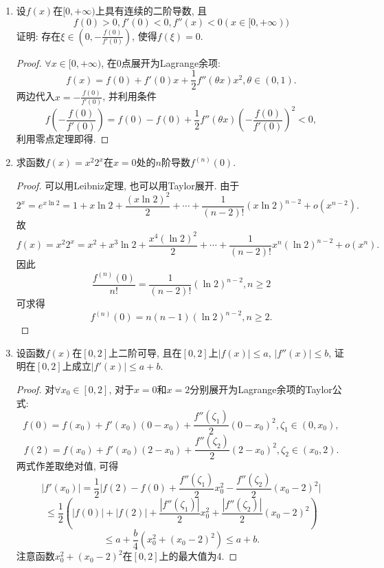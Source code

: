 \documentclass[UTF8,11pt, a4paper, oneside, fontset=none]{ctexbook}
\begin{document}
\begin{enumerate}
\begin{proof}
\end{proof}


\item 设$f(x)$在$[0, + \infty)$上具有连续的二阶导数, 且
\[
f(0) >0, f'(0) <0, f''(x) < 0 (x \in [0, + \infty))
\]
证明: 存在$\xi \in \left( 0, - \frac{f(0)}{f'(0)}\right)$, 使得$f(\xi ) = 0$.

\begin{proof}
$\forall x \in [0, + \infty)$, 在$0$点展开为Lagrange余项:
\[
f(x) = f(0) + f'(0)x + \frac{1}{2} f''(\theta x) x^2, \theta \in (0, 1).
\]
两边代入$x = - \frac{f(0)}{f'(0)}$, 并利用条件
\[
f\left(- \frac{f(0)}{f'(0)} \right) = f(0) - f(0) +  \frac{1}{2} f''(\theta x) \left( - \frac{f(0)}{f'(0)}\right)^2 <0,
\]
利用零点定理即得.
\end{proof}


\item 求函数$f(x) = x^2 2^x$在$x = 0$处的$n$阶导数$f^{(n)}(0)$.


\begin{proof}

可以用Leibniz定理, 也可以用Taylor展开. 由于
\[
2^x = e^{x \ln 2} = 1 + x \ln 2 + \frac{(x \ln 2)^2}{2} + \cdots + \frac{1}{(n-2)!} (x \ln 2)^{n-2} + o(x^{n-2}).
\]
故
\[
f(x) = x^2 2^x = x^2 + x^3 \ln 2 + \frac{x^4 (\ln 2)^2}{2} + \cdots + \frac{1}{(n-2)!} x^n (\ln 2)^{n-2} + o(x^n).
\]
因此
\[
\frac{f^{(n)}(0)}{n!} = \frac{1}{(n-2)!} (\ln 2)^{n-2}, n \geq 2
\]
可求得
\[
f^{(n)}(0) = n (n-1)(\ln 2)^{n-2}, n \geq 2.
\]

\end{proof}

\item 设函数$f(x)$在$[0, 2]$上二阶可导, 且在$[0, 2]$上$|f(x)| \leq a$, $|f''(x)| \leq b$, 证明在$[0, 2]$上成立$|f'(x)| \leq a+b$.


\begin{proof}

对$\forall x_0 \in [0, 2]$, 对于$x =0$和$x=2$分别展开为Lagrange余项的Taylor公式:
\[
f(0) = f(x_0) + f'(x_0) (0 - x_0) + \frac{f''(\zeta_1)}{2} (0 - x_0)^2, \zeta_1 \in (0, x_0),
\]
\[
f(2) = f(x_0) + f'(x_0) (2 - x_0) + \frac{f''(\zeta_2)}{2} (2 - x_0)^2, \zeta_2 \in (x_0, 2).
\]
两式作差取绝对值, 可得
\[
|f'(x_0)| = \frac{1}{2} \Big| f(2) - f(0) + \frac{f''(\zeta_1)}{2}x_0^2 - \frac{f''(\zeta_2)}{2} (x_0 - 2)^2 \Big|
\]
\[
\leq \frac{1}{2} \left( |f(0)| + |f(2)| + \frac{|f''(\zeta_1)|}{2}x_0^2 +  \frac{|f''(\zeta_2)|}{2} (x_0 - 2)^2  \right)
\]
\[
\leq a + \frac{b}{4} (x_0^2 + (x_0 - 2)^2) \leq a+b.
\]
注意函数$x_0^2 + (x_0 - 2)^2$在$[0, 2]$上的最大值为4.
\end{proof}




\end{enumerate}
\end{document}
